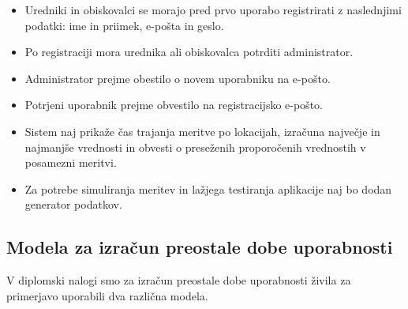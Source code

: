 \documentclass[a4paper, 12pt]{book}
\begin{document}
\begin{itemize}
\item Uredniki in obiskovalci se morajo pred prvo uporabo registrirati z naslednjimi podatki: ime in priimek, e-pošta in geslo.

\item Po registraciji mora urednika ali obiskovalca potrditi administrator.

\item Administrator prejme obestilo o novem uporabniku na e-pošto.

\item Potrjeni uporabnik prejme obvestilo na registracijsko e-pošto.

\item Sistem naj prikaže čas trajanja meritve po lokacijah, izračuna največje in najmanjše vrednosti in obvesti o preseženih proporočenih vrednostih v posamezni meritvi.

\item Za potrebe simuliranja meritev in lažjega testiranja aplikacije naj bo dodan generator podatkov.

\end{itemize}


\subsection{Modela za izračun preostale dobe uporabnosti}
\label{modela-za-izracun-sl}

V diplomski nalogi smo za izračun preostale dobe uporabnosti živila za primerjavo uporabili dva različna modela.
\end{document}
